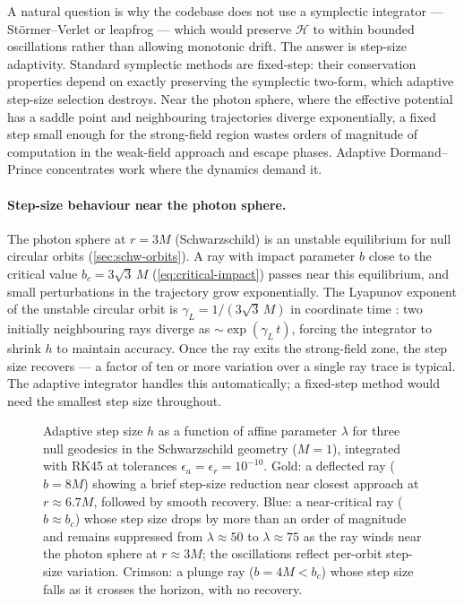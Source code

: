 A natural question is why the codebase does not use a symplectic
integrator --- St\"ormer--Verlet or leapfrog --- which would preserve
$\mathcal{H}$ to within bounded oscillations rather than allowing
monotonic drift.  The answer is step-size adaptivity.  Standard
symplectic methods are fixed-step: their conservation properties
depend on exactly preserving the symplectic two-form, which adaptive
step-size selection destroys.  Near the photon sphere, where the
effective potential has a saddle point and neighbouring trajectories
diverge exponentially, a fixed step small enough for the strong-field
region wastes orders of magnitude of computation in the weak-field
approach and escape phases.  Adaptive Dormand--Prince concentrates
work where the dynamics demand it.

\paragraph{Step-size behaviour near the photon sphere.}

The photon sphere at $r = 3M$ (Schwarzschild) is an unstable
equilibrium for null circular orbits (\cref{sec:schw-orbits}).  A ray
with impact parameter $b$ close to the critical value
$b_c = 3\sqrt{3}\,M$ (\cref{eq:critical-impact}) passes near this
equilibrium, and small perturbations in the trajectory grow
exponentially.  The Lyapunov exponent of the unstable circular orbit
is $\gamma_L = 1/(3\sqrt{3}\,M)$ in coordinate time
\cite{Cardoso2009}: two initially neighbouring rays diverge as
$\sim\!\exp(\gamma_L\,t)$, forcing the integrator to shrink $h$ to
maintain accuracy.  Once the ray exits the strong-field zone, the step
size recovers --- a factor of ten or more variation over a single ray
trace is typical.  The adaptive integrator handles this automatically;
a fixed-step method would need the smallest step size throughout.

\begin{figure}[htbp]
  \centering
  
  \caption[Adaptive step-size profiles near the photon sphere]{%
    Adaptive step size $h$ as a function of affine parameter
    $\lambda$ for three null geodesics in the Schwarzschild
    geometry ($M = 1$), integrated with RK45 at tolerances
    $\epsilon_a = \epsilon_r = 10^{-10}$.  Gold: a deflected ray
    ($b = 8M$) showing a brief step-size reduction near closest
    approach at $r \approx 6.7M$, followed by smooth recovery.
    Blue: a near-critical ray ($b \approx b_c$) whose step size
    drops by more than an order of magnitude and remains
    suppressed from $\lambda \approx 50$ to $\lambda \approx 75$
    as the ray winds near the photon sphere at $r \approx 3M$;
    the oscillations reflect per-orbit step-size variation.
    Crimson: a plunge ray ($b = 4M < b_c$) whose step size falls
    as it crosses the horizon, with no recovery.}
  \label{fig:step-size-profile}
\end{figure}

